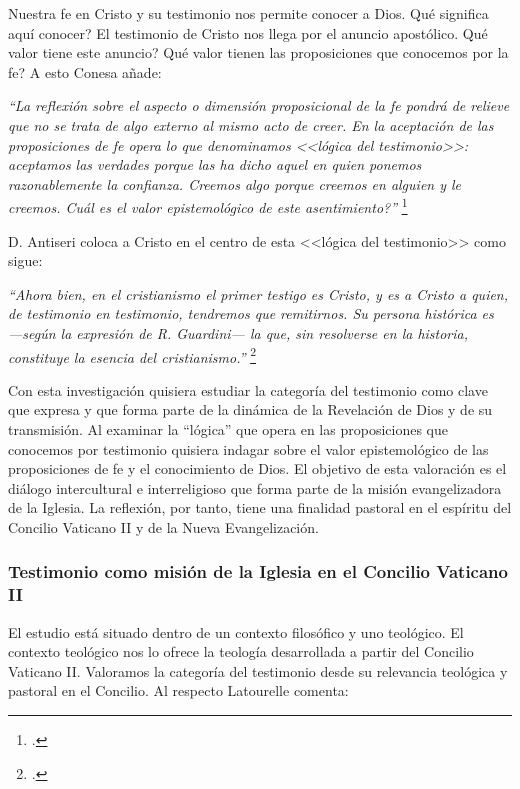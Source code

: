 \documentclass[11pt]{article}
\begin{document}
Nuestra fe en Cristo y su testimonio nos permite conocer a Dios. \textquestiondown{}{}Qué significa aquí conocer? El testimonio de Cristo nos llega por el anuncio apostólico. \textquestiondown{}{}Qué valor tiene este anuncio? \textquestiondown{}{}Qué valor tienen las proposiciones que conocemos por la fe? A esto Conesa añade:

\emph{
``La reflexión sobre el aspecto o dimensión proposicional de la fe pondrá de relieve que no se trata de algo externo al mismo acto de creer. En la aceptación de las proposiciones de fe opera lo que denominamos <<lógica del testimonio>>: aceptamos las verdades porque las ha dicho aquel en quien ponemos razonablemente la confianza. Creemos algo porque creemos en alguien y le creemos. \textquestiondown{}{}Cuál es el valor epistemológico de este asentimiento?''
}\footcite[p.483]{feylogicaconesa}

D. Antiseri coloca a Cristo en el centro de esta <<lógica del testimonio>> como sigue:

\emph{
``Ahora bien, en el cristianismo el primer testigo es Cristo, y es a Cristo a quien, de testimonio en testimonio, tendremos que remitirnos. Su persona histórica es ---según la expresión de R. Guardini--- la que, sin resolverse en la historia, constituye la esencia del cristianismo.''
}\footcite[168]{antiseri}

Con esta investigación quisiera estudiar la categoría del testimonio como clave que expresa y que forma parte de la dinámica de la Revelación de Dios y de su transmisión. Al examinar la ``lógica'' que opera en las proposiciones que conocemos por testimonio quisiera indagar sobre el valor epistemológico de las proposiciones de fe y el conocimiento de Dios. El objetivo de esta valoración es el diálogo intercultural e interreligioso que forma parte de la misión evangelizadora de la Iglesia. La reflexión, por tanto, tiene una finalidad pastoral en el espíritu del Concilio Vaticano II y de la Nueva Evangelización.

\subsubsection{Testimonio como misión de la Iglesia en el Concilio Vaticano II}

El estudio está situado dentro de un contexto filosófico y uno teológico. El contexto teológico nos lo ofrece la teología desarrollada a partir del Concilio Vaticano II. Valoramos la categoría del testimonio desde su relevancia teológica y pastoral en el Concilio. Al respecto Latourelle comenta:
\end{document}
